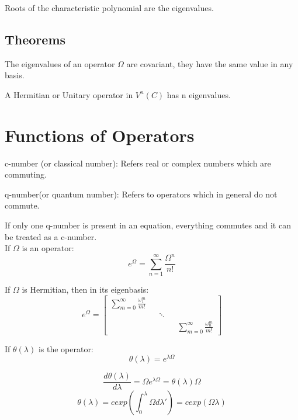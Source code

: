 Roots of the characteristic polynomial are the eigenvalues.

\subsection{Theorems}
\begin{theorem}
	The eigenvalues of an operator $\Omega$ are covariant, they have the same value in any basis.
\end{theorem}

\begin{theorem}
	A Hermitian or Unitary operator in $V^n(C)$ has n eigenvalues.
\end{theorem}

\section{Functions of Operators}

\begin{definition}{c-number (or classical number):}
	Refers real or complex numbers which are commuting.
\end{definition}

\begin{definition}{q-number(or quantum number):}
	Refers to operators which in general do not commute.
\end{definition}
If only one q-number is present in an equation, everything commutes and it can be treated as a c-number. 
\\
If $\Omega$ is an operator:
\begin{equation}
	e^\Omega = \sum_{n=1}^{\infty} \frac{\Omega^n}{n!}
\end{equation}	


If $\Omega$ is Hermitian, then in its eigenbasis:
\begin{equation}
	e^\Omega = \begin{bmatrix}
		\sum_{m=0}^{\infty} \frac{\omega_1^m}{m!} && && \\
		&& \ddots && \\
		&& && \sum_{m=0}^{\infty} \frac{\omega_n^m}{m!}
	\end{bmatrix}
\end{equation}


If $\theta(\lambda)$ is the operator:
\begin{equation}
	\theta(\lambda) = e^{\lambda \Omega}
\end{equation}

\begin{equation}
	\frac{d\theta (\lambda)}{d\lambda} = \Omega e^{\lambda \Omega} = \theta(\lambda)\Omega
\end{equation}
\begin{equation}
	\theta (\lambda) = c exp\left( \int_0^{\lambda} \Omega d\lambda' \right) = c exp(\Omega \lambda)
\end{equation}

